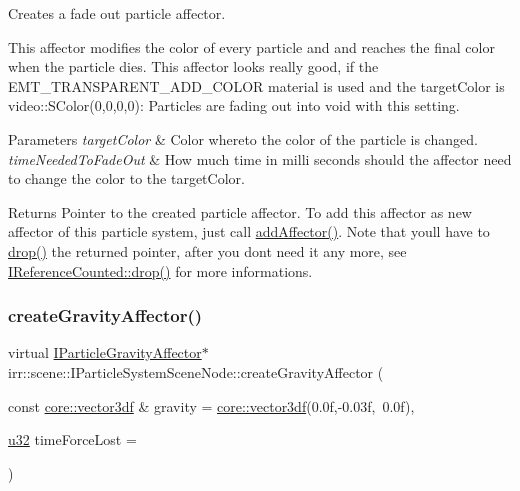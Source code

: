 Creates a fade out particle affector. 

This affector modifies the color of every particle and and reaches the final color when the particle dies. This affector looks really good, if the E\+M\+T\+\_\+\+T\+R\+A\+N\+S\+P\+A\+R\+E\+N\+T\+\_\+\+A\+D\+D\+\_\+\+C\+O\+L\+OR material is used and the target\+Color is video\+::\+S\+Color(0,0,0,0)\+: Particles are fading out into void with this setting. 
\begin{DoxyParams}{Parameters}
{\em target\+Color} & Color whereto the color of the particle is changed. \\
\hline
{\em time\+Needed\+To\+Fade\+Out} & How much time in milli seconds should the affector need to change the color to the target\+Color. \\
\hline
\end{DoxyParams}
\begin{DoxyReturn}{Returns}
Pointer to the created particle affector. To add this affector as new affector of this particle system, just call \hyperlink{classirr_1_1scene_1_1IParticleSystemSceneNode_a401f5afbbb748878011c5ceb7d447f8b}{add\+Affector()}. Note that you\textquotesingle{}ll have to \hyperlink{classirr_1_1IReferenceCounted_a03856a09355b89d178090c4a5f738543}{drop()} the returned pointer, after you don\textquotesingle{}t need it any more, see \hyperlink{classirr_1_1IReferenceCounted_a03856a09355b89d178090c4a5f738543}{I\+Reference\+Counted\+::drop()} for more informations. 
\end{DoxyReturn}
\mbox{\label{classirr_1_1scene_1_1IParticleSystemSceneNode_af06d3565f9c352bdcdf68bb2e3797c32}} 
\subsubsection{\texorpdfstring{create\+Gravity\+Affector()}{createGravityAffector()}\hspace{0.1cm}{\footnotesize\ttfamily [1/2]}}
{\footnotesize\ttfamily virtual \hyperlink{classirr_1_1scene_1_1IParticleGravityAffector}{I\+Particle\+Gravity\+Affector}$\ast$ irr\+::scene\+::\+I\+Particle\+System\+Scene\+Node\+::create\+Gravity\+Affector (\begin{DoxyParamCaption}\item[{const \hyperlink{namespaceirr_1_1core_ae6e2b2a6c552833ebbd5b7463d03586b}{core\+::vector3df} \&}]{gravity = {\ttfamily \hyperlink{namespaceirr_1_1core_ae6e2b2a6c552833ebbd5b7463d03586b}{core\+::vector3df}(0.0f,-\/0.03f,~0.0f)},  }\item[{\hyperlink{namespaceirr_a0416a53257075833e7002efd0a18e804}{u32}}]{time\+Force\+Lost = {} }\end{DoxyParamCaption})\hspace{0.3cm}{\ttfamily [pure virtual]}}




